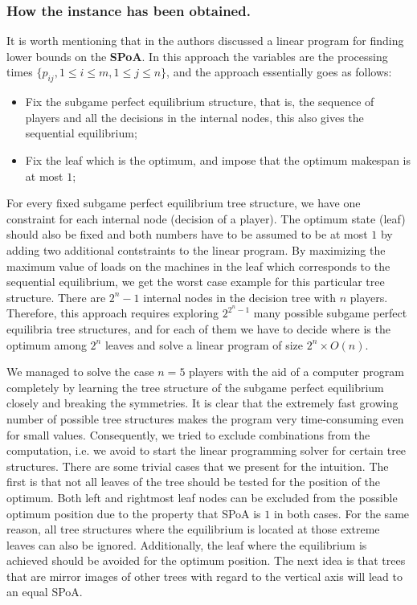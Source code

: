 \documentclass[runningheads]{llncs}
\newcommand{\SPoA}{\textbf{SPoA}\xspace}
\begin{document}
\subsubsection{How the instance has been obtained.} 
It is worth mentioning that in \cite{Hassin} the authors discussed a linear program for finding lower bounds on the \SPoA. In this approach the variables are the processing times $\{p_{ij}, 1\leq i \leq m, 1\leq j \leq n \}$, and the approach essentially goes  as follows: 
\begin{itemize}
	\item Fix the subgame perfect equilibrium structure, that is, the sequence of players and all the decisions in the internal nodes, this also gives the sequential equilibrium;
	\item Fix the leaf which is the optimum, and impose that the optimum makespan is at most $1$; 
\end{itemize}
For every fixed  subgame perfect equilibrium tree structure, we have one constraint for each internal node (decision of a player).
The optimum state (leaf) should also be fixed and both numbers have to be assumed to be at most $1$ by adding two additional contstraints to the linear program. By maximizing the maximum value of loads on the machines in the leaf which corresponds to the sequential equilibrium, we get the worst case example for this particular tree structure. There are $2^{n}-1$ internal nodes in the decision tree with $n$ players. Therefore, this  approach requires exploring $2^{2^{n}-1}$ many possible subgame perfect equilibria tree structures, and for each of them we have to decide where is the optimum among $2^n$ leaves and solve a linear program of size $2^n \times O(n)$.

We managed to solve the case $n=5$ players with the aid of a computer program completely by learning the tree structure of the subgame perfect equilibrium closely and breaking the symmetries. 
It is clear that the extremely fast growing number of possible tree structures
makes the program very time-consuming even for small values. Consequently, we tried to exclude combinations from the
computation, i.e. we avoid to start the linear programming solver for
certain tree structures. There are some trivial cases that we present for the intuition. The first is that not
all leaves of the tree should be tested for the position of the optimum. Both
left and rightmost leaf nodes can be excluded from the possible optimum position due to
the property that SPoA is $1$ in both cases. For the same reason, all tree structures
where the equilibrium is located at those extreme leaves can also be ignored.
Additionally, the leaf where the equilibrium is achieved should be avoided for
the optimum position.
The next idea is that trees that are mirror images of other trees with regard
to the vertical axis will lead to an equal SPoA. 
\end{document}
